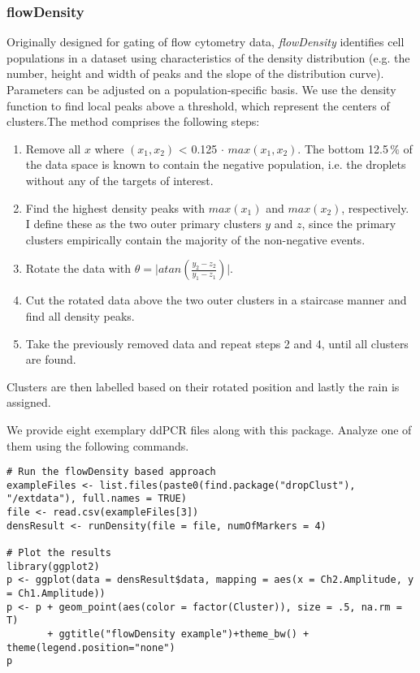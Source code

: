 \documentclass{article}
\begin{document}
\subsubsection{flowDensity}
Originally designed for gating of flow cytometry data, \emph{flowDensity} identifies cell populations in a dataset using characteristics of the density distribution (e.g. the number, height and width of peaks and the slope of the distribution curve). Parameters can be adjusted on a population-specific basis. We use the density function to find local peaks above a threshold, which represent the centers of clusters.The method comprises the following steps:
\begin{enumerate}
\item Remove all $x$ where $(x_1,x_2)$ < 0.125$\,\cdot\,max(x_1,x_2)$. The bottom 12.5$\,\%$ of the data space is known to contain the negative population, i.e. the droplets without any of the targets of interest.
\item Find the highest density peaks with $max(x_1)$ and $max(x_2)$, respectively. I define these as the two outer primary clusters $y$ and $z$, since the primary clusters empirically contain the majority of the non-negative events. 
\item Rotate the data with $\theta = \lvert atan(\frac{y_2 - z_2}{y_1 - z_1}) \rvert$.
\item Cut the rotated data above the two outer clusters in a staircase manner and find all density peaks.
\item Take the previously removed data and repeat steps 2 and 4, until all clusters are found.
\end{enumerate}
Clusters are then labelled based on their rotated position and lastly the rain is assigned.

We provide eight exemplary ddPCR files along with this package. Analyze one of them using the following commands.
\begin{verbatim}
# Run the flowDensity based approach
exampleFiles <- list.files(paste0(find.package("dropClust"), "/extdata"), full.names = TRUE)
file <- read.csv(exampleFiles[3])
densResult <- runDensity(file = file, numOfMarkers = 4)

# Plot the results
library(ggplot2)
p <- ggplot(data = densResult$data, mapping = aes(x = Ch2.Amplitude, y = Ch1.Amplitude))
p <- p + geom_point(aes(color = factor(Cluster)), size = .5, na.rm = T)
       + ggtitle("flowDensity example")+theme_bw() + theme(legend.position="none")
p
\end{verbatim}
\end{document}
